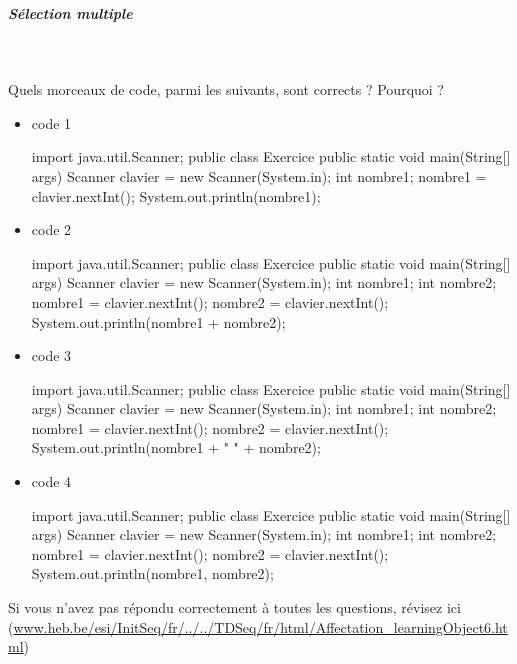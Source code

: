 \documentclass[11pt,a4paper]{article}
\begin{document}
		\subparagraph{S\'election multiple} 
		
                \textcolor{white}{.} \par
            Quels morceaux de code, parmi les suivants, sont corrects ? Pourquoi ?
						
            \begin{itemize} 
        
            \item[ \ding{"6F} ]  
							code 1
							\begin{Java}
    import java.util.Scanner;
    public class Exercice { 
        public static void main(String[] args) { 
            Scanner clavier = new Scanner(System.in); 
            int nombre1; 
            nombre1 = clavier.nextInt();
            System.out.println(nombre1);
        } 
    }						\end{Java}
        
            \item[ \ding{"6F} ]  
							code 2
							\begin{Java}
    import java.util.Scanner;
    public class Exercice {  
        public static void main(String[] args) {
            Scanner clavier = new Scanner(System.in);
            int nombre1;
            int nombre2;
            nombre1 = clavier.nextInt();
            nombre2 = clavier.nextInt();
            System.out.println(nombre1 + nombre2);
        }  
    }						\end{Java}
        
            \item[ \ding{"6F} ]  
							code 3
							\begin{Java}
    import java.util.Scanner;
    public class Exercice {  
        public static void main(String[] args) {
            Scanner clavier = new Scanner(System.in);
            int nombre1;
            int nombre2;
            nombre1 = clavier.nextInt();
            nombre2 = clavier.nextInt();
            System.out.println(nombre1 + " " + nombre2);
        }  
    }						\end{Java}
        
            \item[ \ding{"6F} ]  
							code 4
							\begin{Java}
    import java.util.Scanner;
    public class Exercice {  
        public static void main(String[] args) {
            Scanner clavier = new Scanner(System.in);
            int nombre1;
            int nombre2;
            nombre1 = clavier.nextInt();
            nombre2 = clavier.nextInt();
            System.out.println(nombre1, nombre2);
        }  
    }						\end{Java}
        
            \end{itemize} 
        Si vous n'avez pas r\'epondu correctement \`a toutes les questions, 
        r\'evisez ici (\url{www.heb.be/esi/InitSeq/fr/../../TDSeq/fr/html/Affectation\_learningObject6.html})
            \par
\end{document}
